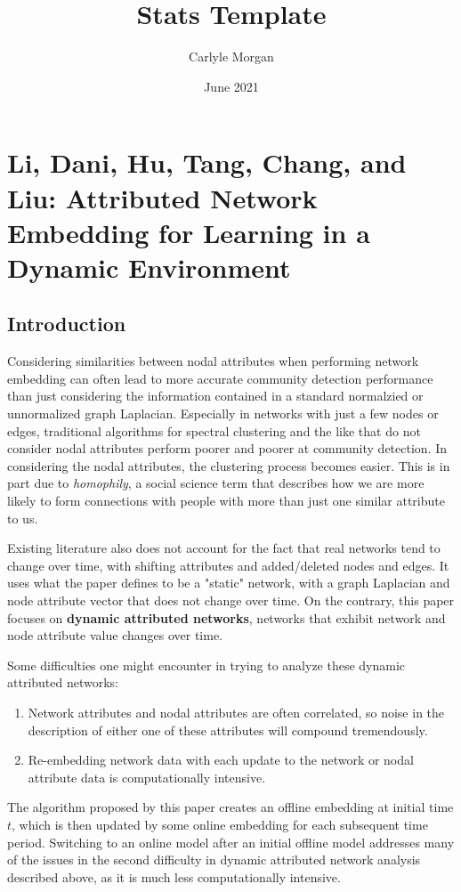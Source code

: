 \documentclass{article}
\title{Stats Template}
\author{Carlyle Morgan}
\date{June 2021}
\begin{document}
\section{Li, Dani, Hu, Tang, Chang, and Liu: Attributed Network Embedding for Learning in a Dynamic Environment}
\subsection{Introduction}

Considering similarities between nodal attributes when performing network embedding can often lead to more accurate community detection performance than just considering the information contained in a standard normalzied or unnormalized graph Laplacian. Especially in networks with just a few nodes or edges, traditional algorithms for spectral clustering and the like that do not consider nodal attributes perform poorer and poorer at community detection. In considering the nodal attributes, the clustering process becomes easier.  This is in part due to \textit{homophily}, a social science term that describes how we are more likely to form connections with people with more than just one similar attribute to us. 

Existing literature also does not account for the fact that real networks tend to change over time, with shifting attributes and added/deleted nodes and edges. It uses what the paper defines to be a "static" network, with a graph Laplacian and node attribute vector that does not change over time. On the contrary, this paper focuses on \textbf{dynamic attributed networks}, networks that exhibit network and node attribute value changes over time.

Some difficulties one might encounter in trying to analyze these dynamic attributed networks:
\begin{enumerate}
\item Network attributes and nodal attributes are often correlated, so noise in the description of either one of these attributes will compound tremendously.
\item Re-embedding network data with each update to the network or nodal attribute data is computationally intensive.
\end{enumerate}

The algorithm proposed by this paper creates an offline embedding at initial time $t$, which is then updated by some online embedding for each subsequent time period. Switching to an online model after an initial offline model addresses many of the issues in the second difficulty in dynamic attributed network analysis described above, as it is much less computationally intensive. 
\end{document}
